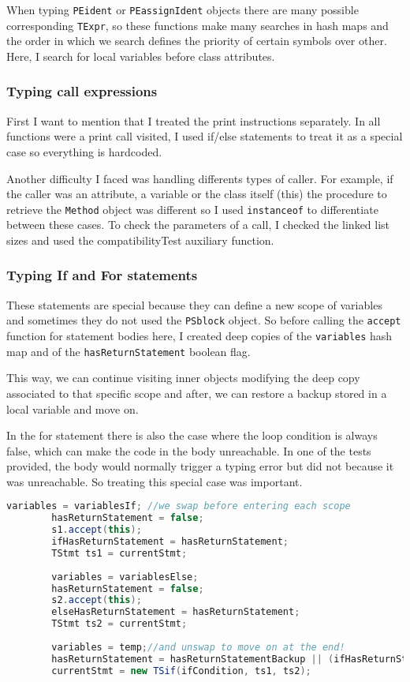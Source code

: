 \documentclass[a4paper,12pt,twoside]{article}
\begin{document}
	When typing \texttt{PEident} or \texttt{PEassignIdent} objects there are many possible corresponding \texttt{TExpr}, so these functions make many searches in hash maps and the order in which we search defines the priority of certain symbols over other. Here, I search for local variables before class attributes.
	
	\subsubsection{Typing call expressions}
	
	First I want to mention that I treated the print instructions separately. In all functions were a print call visited, I used if/else statements to treat it as a special case so everything is hardcoded.
	
	Another difficulty I faced was handling differents types of caller. For example, if the caller was an attribute, a variable or the class itself (this) the procedure to retrieve the \texttt{Method} object was different so I used \texttt{instanceof} to differentiate between these cases. To check the parameters of a call, I checked the linked list sizes and used the compatibilityTest auxiliary function.
	
	\subsubsection{Typing If and For statements}
	
	These statements are special because they can define a new scope of variables and sometimes they do not used the \texttt{PSblock} object. So before calling the \texttt{accept} function for statement bodies here, I created deep copies of the \texttt{variables} hash map and of the \texttt{hasReturnStatement} boolean flag.
	
	This way, we can continue visiting inner objects modifying the deep copy associated to that specific scope and after, we can restore a backup stored in a local variable and move on.
	
	In the for statement there is also the case where the loop condition is always false, which can make the code in the body unreachable. In one of the tests provided, the body would normally trigger a typing error but did not because it was unreachable. So treating this special case was important.
	
	\begin{lstlisting}[language=Java]
		variables = variablesIf; //we swap before entering each scope
		hasReturnStatement = false;
		s1.accept(this);
		ifHasReturnStatement = hasReturnStatement;
		TStmt ts1 = currentStmt;
		
		variables = variablesElse;
		hasReturnStatement = false;
		s2.accept(this);
		elseHasReturnStatement = hasReturnStatement;
		TStmt ts2 = currentStmt;
		
		variables = temp;//and unswap to move on at the end!
		hasReturnStatement = hasReturnStatementBackup || (ifHasReturnStatement && elseHasReturnStatement); //both paths must have returns!!
		currentStmt = new TSif(ifCondition, ts1, ts2);
	\end{lstlisting}
	
\end{document}
